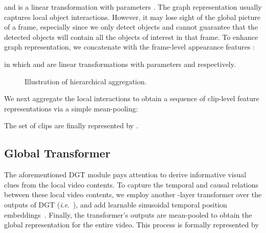 \documentclass[10pt,journal,compsoc]{IEEEtran}
\newcommand{\ie}{\textit{i}.\textit{e}.}
\begin{document}
and  is a linear transformation with parameters . 
The graph representation usually captures local object interactions. However, it may lose sight of the global picture of a frame, especially since we only detect  objects and cannot guarantee that the detected objects will contain all the objects of interest in that frame. To enhance graph representation, we concatenate  with the frame-level appearance features :

in which  and  are linear transformations with parameters  and  respectively.
\begin{figure}[t]
  \begin{center}
  \end{center}
  \vspace{-0.3cm}
  \caption{Illustration of hierarchical aggregation.}
  \label{fig:hpool}
  \vspace{-0.4cm}
\end{figure}

We next aggregate the local interactions to obtain a sequence of clip-level feature representations via a simple mean-pooling:

\noindent The set of  clips are finally represented by  . 

\subsection{Global Transformer}
\label{sec:gt}
The aforementioned DGT module pays attention to derive informative visual clues from the local video contents. To capture the temporal and causal relations between these local video contents, we employ another -layer transformer over the outputs of DGT (\ie~), and add learnable sinusoidal temporal position embeddings~\cite{devlin2018bert}. Finally, the transformer's outputs are mean-pooled to obtain the global representation  for the entire video. This process is formally represented by
\end{document}
